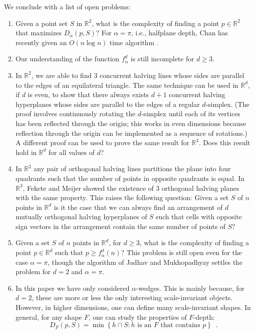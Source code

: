 \documentclass[lotsofwhite]{patmorin}
\newcommand{\R}{\mathbb{R}}
\begin{document}
We conclude with a list of open problems:

\begin{enumerate}
\item Given a point set $S$ in $\R^2$, what is the complexity
of finding a point $p\in\R^2$ that maximizes $D_\alpha(p,S)$?
For $\alpha=\pi$, i.e., halfplane depth, Chan has recently given an
$O(n\log n)$ time algorithm \cite{c04}.

\item Our understanding of the function $f^d_\alpha$ is still
incomplete for $d\ge 3$.

\item In $\R^2$, we are able to find 3 concurrent halving
lines whose sides are parallel to the edges of an equilateral
triangle.  The same technique can be used in $\R^d$, if $d$ is
even, to show that there always exists $d+1$ concurrent halving
hyperplanes whose sides are parallel to the edges of a regular
$d$-simplex. (The proof involves continuously rotating the
$d$-simplex until each of its vertices has been reflected through the
origin; this works in even dimensions because reflection through the
origin can be implemented as a sequence of rotations.)
A different proof can be used to prove the same result for
$\R^3$.  Does this result hold in $\R^d$ for all
values of $d$?

\item In $\R^2$ any pair of orthogonal halving lines partitions
the plane into four quadrants such that the number of points in
opposite quadrants is equal. In $\R^3$, Fekete and Meijer
\cite{fm00} showed the existence of 3 orthogonal halving planes with the same
property.  This raises the following question: Given a set $S$ of $n$
points in $\R^d$ is it the case that we can always find an
arrangement of $d$ mutually orthogonal halving hyperplanes of $S$ such
that cells with opposite sign vectors in the arrangement contain the
same number of points of $S$?

\item Given a set $S$ of $n$ points in $\R^d$, for $d\ge 3$,
what is the complexity of finding a point $p\in \R^d$ such
that $p\ge f_\alpha^d(n)$?  This problem is still open even for the
case $\alpha=\pi$, though the algorithm of Jadhav and Mukhopadhyay
\cite{jm94} settles the problem for $d=2$ and $\alpha=\pi$. 

\item In this paper we have only considered $\alpha$-wedges.  This is
mainly because, for $d=2$, these are more or less the only interesting
scale-invariant objects.  However, in higher dimensions, one can
define many scale-invariant shapes.  In general, for any shape $F$,
one can study the properties of $F$-depth:
\[
  D_F(p,S) = \min\left\{ 
     h\cap S : \mbox{$h$ is an $F$ that contains $p$}
  \right\} \enspace .
\] 
\end{enumerate}
\end{document}
